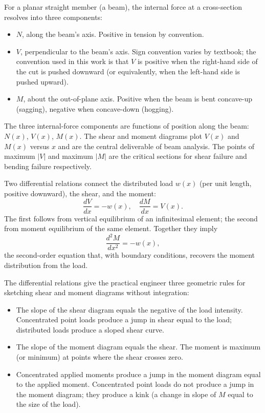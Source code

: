 For a planar straight member (a beam), the internal force at a
cross-section resolves into three components:

\begin{itemize}[leftmargin=*]
  \item {} $N$, along the beam's axis. Positive
    in tension by convention.
  \item {} $V$, perpendicular to the beam's
    axis. Sign convention varies by textbook; the convention used
    in this work is that $V$ is positive when the right-hand side
    of the cut is pushed downward (or equivalently, when the
    left-hand side is pushed upward).
  \item {} $M$, about the out-of-plane axis.
    Positive when the beam is bent concave-up (sagging), negative
    when concave-down (hogging).
\end{itemize}

The three internal-force components are functions of position along
the beam: $N(x)$, $V(x)$, $M(x)$. The shear and moment diagrams
plot $V(x)$ and $M(x)$ versus $x$ and are the central deliverable of
beam analysis. The points of maximum $|V|$ and maximum $|M|$ are the
critical sections for shear failure and bending failure
respectively.

Two differential relations connect the distributed load $w(x)$ (per
unit length, positive downward), the shear, and the moment:
\[
\frac{dV}{dx} = -w(x), \quad \frac{dM}{dx} = V(x).
\]
The first follows from vertical equilibrium of an infinitesimal
element; the second from moment equilibrium of the same element.
Together they imply
\[
\frac{d^2 M}{dx^2} = -w(x),
\]
the second-order equation that, with boundary conditions, recovers
the moment distribution from the load.

The differential relations give the practical engineer three
geometric rules for sketching shear and moment diagrams without
integration:

\begin{itemize}[leftmargin=*]
  \item The slope of the shear diagram equals the negative of the
    load intensity. Concentrated point loads produce a jump in
    shear equal to the load; distributed loads produce a sloped
    shear curve.
  \item The slope of the moment diagram equals the shear. The
    moment is maximum (or minimum) at points where the shear
    crosses zero.
  \item Concentrated applied moments produce a jump in the moment
    diagram equal to the applied moment. Concentrated point loads
    do not produce a jump in the moment diagram; they produce a
    kink (a change in slope of $M$ equal to the size of the load).
\end{itemize}


